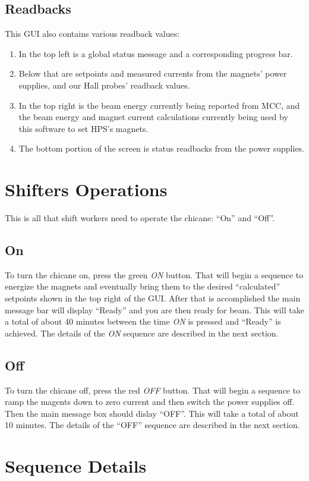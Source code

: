 \documentclass[amsmath,amssymb,notitlepage,12pt]{revtex4-1}
\begin{document}
\subsection{Readbacks}
This GUI also contains various readback values:
\begin{enumerate}
    \item In the top left is a global status message and a corresponding progress bar.
    \item Below that are setpoints and measured currents from the magnets' power supplies, and our Hall probes' readback values.
    \item In the top right is the beam energy currently being reported from MCC, and the beam energy and magnet current calculations currently being used by this software to set HPS's magnets.
    \item The bottom portion of the screen is status readbacks from the power supplies.
\end{enumerate}

\section{Shifters Operations}
This is all that shift workers need to operate the chicane:  ``On'' and ``Off''.
\subsection{On}
To turn the chicane on, press the green {\em ON} button.  That will begin a sequence to energize the magnets and eventually bring them to the desired ``calculated'' setpoints shown in the top right of the GUI.  After that is accomplished the main message bar will display ``Ready'' and you are then ready for beam.  This will take a total of about 40 minutes between the time {\em ON} is pressed and ``Ready'' is achieved.  The details of the {\em ON} sequence are described in the next section.
\subsection{Off}
To turn the chicane off, press the red {\em OFF} button.  That will begin a sequence to ramp the magents down to zero current and then switch the power supplies off.  Then the main message box should dislay ``OFF''.  This will take a total of about 10 minutes.  The details of the ``OFF'' sequence are described in the next section.

\section{Sequence Details}
\end{document}
